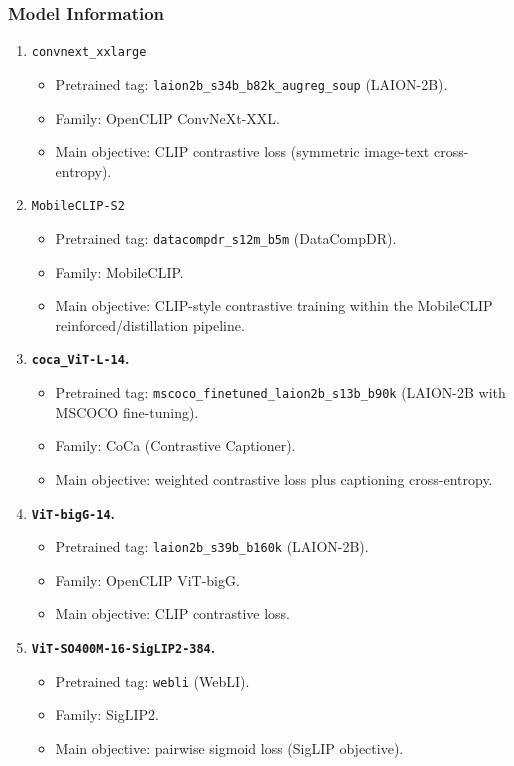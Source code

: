 \subsubsection*{Model Information}
\begin{enumerate}
    \item \texttt{convnext\_xxlarge} 
        \begin{itemize}
            \item Pretrained tag: \texttt{laion2b\_s34b\_b82k\_augreg\_soup} (LAION-2B).
            \item Family: OpenCLIP ConvNeXt-XXL.
            \item Main objective: CLIP contrastive loss (symmetric image-text cross-entropy).
        \end{itemize}
    \item \texttt{MobileCLIP-S2} 
        \begin{itemize}
            \item Pretrained tag: \texttt{datacompdr\_s12m\_b5m} (DataCompDR).
            \item Family: MobileCLIP.
            \item Main objective: CLIP-style contrastive training within the MobileCLIP reinforced/distillation pipeline.
        \end{itemize}
    \item \textbf{\texttt{coca\_ViT-L-14}.}
        \begin{itemize}
            \item Pretrained tag: \texttt{mscoco\_finetuned\_laion2b\_s13b\_b90k} (LAION-2B with MSCOCO fine-tuning).
            \item Family: CoCa (Contrastive Captioner).
            \item Main objective: weighted contrastive loss plus captioning cross-entropy.
        \end{itemize}

    \item \textbf{\texttt{ViT-bigG-14}.}
        \begin{itemize}
            \item Pretrained tag: \texttt{laion2b\_s39b\_b160k} (LAION-2B).
            \item Family: OpenCLIP ViT-bigG.
            \item Main objective: CLIP contrastive loss.
        \end{itemize}

    \item \textbf{\texttt{ViT-SO400M-16-SigLIP2-384}.}
        \begin{itemize}
            \item Pretrained tag: \texttt{webli} (WebLI).
            \item Family: SigLIP2.
            \item Main objective: pairwise sigmoid loss (SigLIP objective).
        \end{itemize}


\end{enumerate}

